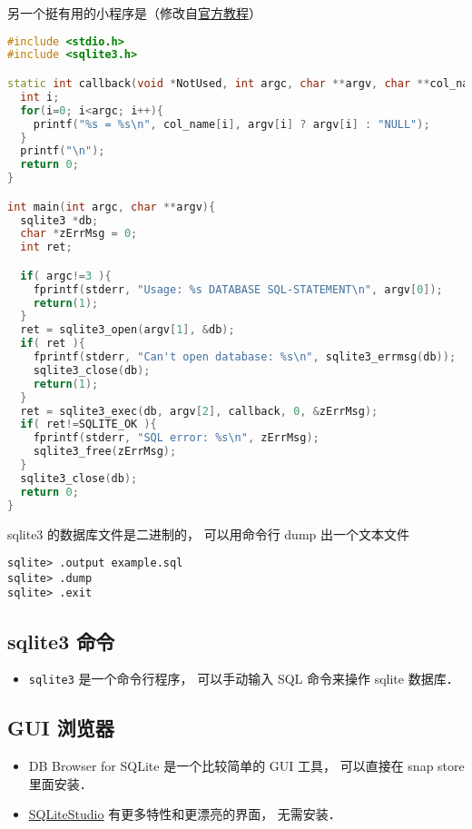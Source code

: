 另一个挺有用的小程序是（修改自\href{https://www.sqlite.org/quickstart.html}{官方教程}）
\begin{lstlisting}[language=cpp]
#include <stdio.h>
#include <sqlite3.h>

static int callback(void *NotUsed, int argc, char **argv, char **col_name){
  int i;
  for(i=0; i<argc; i++){
    printf("%s = %s\n", col_name[i], argv[i] ? argv[i] : "NULL");
  }
  printf("\n");
  return 0;
}

int main(int argc, char **argv){
  sqlite3 *db;
  char *zErrMsg = 0;
  int ret;

  if( argc!=3 ){
    fprintf(stderr, "Usage: %s DATABASE SQL-STATEMENT\n", argv[0]);
    return(1);
  }
  ret = sqlite3_open(argv[1], &db);
  if( ret ){
    fprintf(stderr, "Can't open database: %s\n", sqlite3_errmsg(db));
    sqlite3_close(db);
    return(1);
  }
  ret = sqlite3_exec(db, argv[2], callback, 0, &zErrMsg);
  if( ret!=SQLITE_OK ){
    fprintf(stderr, "SQL error: %s\n", zErrMsg);
    sqlite3_free(zErrMsg);
  }
  sqlite3_close(db);
  return 0;
}
\end{lstlisting}

sqlite3 的数据库文件是二进制的， 可以用命令行 dump 出一个文本文件
\begin{lstlisting}
sqlite> .output example.sql
sqlite> .dump
sqlite> .exit
\end{lstlisting}

\subsection{sqlite3 命令}
\begin{itemize}
\item \verb|sqlite3| 是一个命令行程序， 可以手动输入 SQL 命令来操作 sqlite 数据库．
\end{itemize}

\subsection{GUI 浏览器}
\begin{itemize}
\item DB Browser for SQLite 是一个比较简单的 GUI 工具， 可以直接在 snap store 里面安装．
\item \href{https://sqlitestudio.pl/}{SQLiteStudio} 有更多特性和更漂亮的界面， 无需安装．
\end{itemize}
